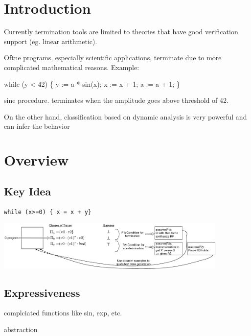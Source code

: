 \documentclass{article}
\begin{document}
\section{Introduction}

Currently termination tools are limited to theories that have good verification support (eg. linear arithmetic).

Oftne programs, especially scientific applications, terminate due to more complicated mathematical reasons. Example:
\begin{center}
  \begin{program}
    wh\tab ile (y < 42) \{
      y := a * sin(x);
      x := x + 1;
      a := a + 1; \untab
    \}
  \end{program}
\end{center}
sine procedure. terminates when the amplitude goes above threshold of 42.

On the other hand, classification based on dynamic analysis is very powerful and can infer the behavior

\section{Overview}

\subsection{Key Idea}

\begin{center}
\texttt{while (x>=0) \{ x = x + y\}}

\bigskip
\includegraphics[width=4.5in]{boxes.eps}

\end{center}

\subsection{Expressiveness}

complciated functions like sin, exp, etc.

abstraction
\end{document}
